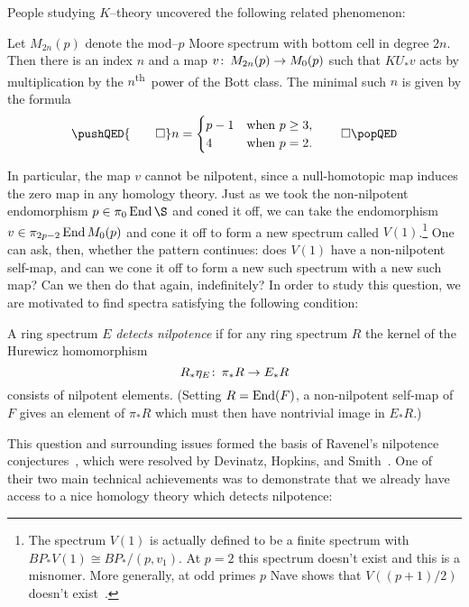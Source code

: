 \noindent People studying \(K\)--theory uncovered the following related phenomenon:

\begin{theorem}\label{AdamsSelfMapThm}
Let \(M_{2n}(p)\) denote the mod--\(p\) Moore spectrum with bottom cell in degree \(2n\).  Then there is an index \(n\) and a map \(v\colon\thinspace M_{2n}(p) \to M_0(p)\) such that \(KU_* v\) acts by multiplication by the \(n\)\textsuperscript{th}\, power of the Bott class.  The minimal such \(n\) is given by the formula
\[
\pushQED{\qed}
n = \begin{cases} p-1 & \text{when \(p \ge 3\)}, \\ 4 & \text{when \(p = 2\)}. \end{cases}
\qedhere
\popQED
\]
\end{theorem}

\noindent In particular, the map \(v\) cannot be nilpotent, since a null-homotopic map induces the zero map in any homology theory.  Just as we took the non-nilpotent endomorphism \(p \in \pi_0 \End \S\) and coned it off, we can take the endomorphism \(v \in \pi_{2p-2} \operatorname{End} M_0(p)\) and cone it off to form a new spectrum called \(V(1)\).\footnote{The spectrum \(V(1)\) is actually defined to be a finite spectrum with \(BP_* V(1) \cong BP_* / (p, v_1)\). At \(p = 2\) this spectrum doesn't exist and this is a misnomer.  More generally, at odd primes \(p\) Nave shows that \(V((p+1)/2)\) doesn't exist~\cite[Theorem 1.3]{Nave}.}  One can ask, then, whether the pattern continues: does \(V(1)\) have a non-nilpotent self-map, and can we cone it off to form a new such spectrum with a new such map?  Can we then do that again, indefinitely?  In order to study this question, we are motivated to find spectra satisfying the following condition:

\begin{definition}
A ring spectrum \(E\) \textit{detects nilpotence} if for any ring spectrum \(R\) the kernel of the Hurewicz homomorphism \[R_*\eta_E\colon\thinspace \pi_* R \to E_* R\] consists of nilpotent elements.  (Setting \(R = \operatorname{End}(F)\), a non-nilpotent self-map of \(F\) gives an element of \(\pi_* R\) which must then have nontrivial image in \(E_* R\).)
\end{definition}

This question and surrounding issues formed the basis of Ravenel's nilpotence conjectures~\cite[Section 10]{RavenelLocalizationWRTPeriodic}, which were resolved by Devinatz, Hopkins, and Smith~\cite{DHS,HopkinsSmith}.  One of their two main technical achievements was to demonstrate that we already have access to a nice homology theory which detects nilpotence:

